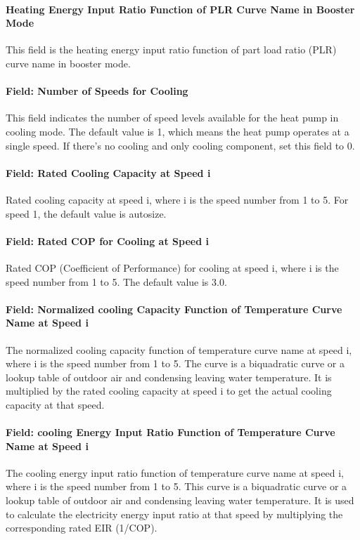\paragraph{Heating Energy Input Ratio Function of PLR Curve Name in Booster
Mode} This field is the heating energy input ratio function of part load ratio
(PLR) curve name in booster mode.
\paragraph{Field: Number of Speeds for Cooling} This field indicates the number
of speed levels available for the heat pump in cooling mode. The default value
is 1, which means the heat pump operates at a single speed. If there's no
cooling and only cooling component, set this field to 0.
\paragraph{Field: Rated Cooling Capacity at Speed i} Rated cooling capacity at
speed i, where i is the speed number from 1 to 5. For speed 1, the default value
is autosize.
\paragraph{Field: Rated COP for Cooling at Speed i} Rated COP (Coefficient of
Performance) for cooling at speed i, where i is the speed number from 1 to 5.
The default value is 3.0.
\paragraph{Field: Normalized cooling Capacity Function of Temperature Curve Name
at Speed i} The normalized cooling capacity function of temperature curve name
at speed i, where i is the speed number from 1 to 5. The curve is a biquadratic
curve or a lookup table of outdoor air and condensing leaving water temperature.
It is multiplied by the rated cooling capacity at speed i to get the actual
cooling capacity at that speed.
\paragraph{Field: cooling Energy Input Ratio Function of Temperature Curve Name
at Speed i} The cooling energy input ratio function of temperature curve name at
speed i, where i is the speed number from 1 to 5. This curve is a biquadratic
curve or a lookup table of outdoor air and condensing leaving water temperature.
It is used to calculate the electricity energy input ratio at that speed by
multiplying the corresponding rated EIR (1/COP).
